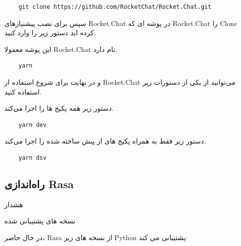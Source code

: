 \begin{latin}
    \begin{verbatim}
    git clone https://github.com/RocketChat/Rocket.Chat.git
    \end{verbatim}
\end{latin}

سپس برای نصب پیشنیاز‌های Rocket.Chat در پوشه ای که Rocket.Chat را Clone کرده اید دستور زیر را وارد کنید.

این پوشه معمولا Rocket.Chat نام دارد.

\begin{latin}
    \begin{verbatim}
    yarn
    \end{verbatim}
\end{latin}

و در نهایت برای شروع استفاده از Rocket.Chat می‌توانید از یکی از دستورات زیر استفاده کنید.

 دستور زیر همه پکیج ها را اجرا می‌کند.
\begin{latin}
    \begin{verbatim}
    yarn dev
    \end{verbatim}
\end{latin}

دستور زیر فقط  به همراه پکیج های از پیش ساخته شده را اجرا می‌کند.

\begin{latin}
    \begin{verbatim}
    yarn dsv
    \end{verbatim}
\end{latin}

\subsection{راه‌اندازی Rasa}

\warning\;هشدار

نسخه های پشتیبانی شده 

در حال حاضر، Rasa از نسخه های زیر Python پشتیبانی می کند:

